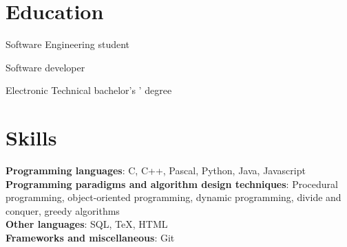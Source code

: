 \documentclass{resume}
\begin{document}
\section{Education}

Software Engineering student

Software developer

Electronic Technical bachelor's ’ degree

\section{Skills}
\smallskip
\textbf{Programming languages}: C, C++, Pascal, Python, Java, Javascript \\
\textbf{Programming paradigms and algorithm design techniques}: Procedural programming, object-oriented programming, dynamic programming, divide and conquer, greedy algorithms \\
\textbf{Other languages}: SQL, TeX, HTML \\
\textbf{Frameworks and miscellaneous}: Git \\
\end{document}
